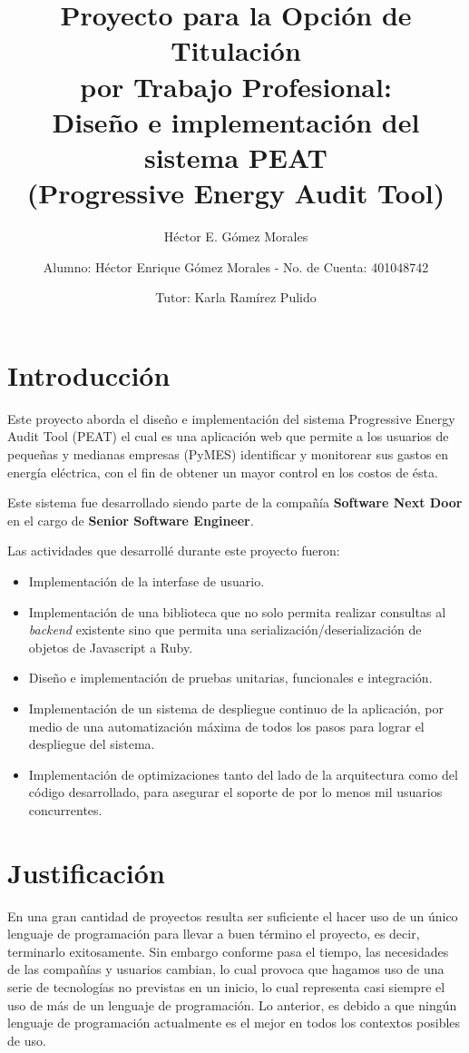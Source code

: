 \documentclass{article}
\author{Héctor E. Gómez Morales}
\title{Proyecto para la Opción de Titulación\\
  por Trabajo Profesional:\\
  Diseño e implementación del sistema PEAT\\
  (Progressive Energy Audit Tool)}
\begin{document}
\author{ Alumno: Héctor Enrique Gómez Morales - No. de Cuenta: 401048742 \and
  Tutor: Karla Ramírez Pulido}
\maketitle
\section{Introducción}
Este proyecto aborda el diseño e implementación del sistema Progressive Energy
Audit Tool (PEAT) el cual es una aplicación web que
permite a los usuarios de pequeñas y medianas empresas (PyMES)
identificar y monitorear sus gastos en energía eléctrica, con el fin de obtener
un mayor control en los costos de ésta.

Este sistema fue desarrollado siendo parte de la compañía
\textbf{Software Next Door} en el cargo de \textbf{Senior Software Engineer}.

Las actividades que desarrollé durante este proyecto fueron:
\begin{itemize}
\item Implementación de la interfase de usuario.
\item Implementación de una biblioteca que no solo permita realizar consultas
  al \textit{backend} existente sino que permita una serialización/deserialización
  de objetos de Javascript a Ruby.
\item Diseño e implementación de pruebas unitarias, funcionales e integración.
\item Implementación de un sistema de despliegue continuo de la aplicación, por
  medio de una automatización máxima de todos los pasos para lograr el despliegue
  del sistema.
\item Implementación de optimizaciones tanto del lado de la arquitectura como
  del código desarrollado, para asegurar el soporte de por lo menos mil usuarios
  concurrentes.
\end{itemize}

\section{Justificación}
En una gran cantidad de proyectos resulta ser suficiente el hacer uso de un
único lenguaje de programación para llevar a buen término el proyecto, es decir,
terminarlo exitosamente. Sin embargo conforme pasa el tiempo, las necesidades
de las compañías y usuarios cambian, lo cual provoca que hagamos uso de una serie de
tecnologías no previstas en un inicio, lo cual representa casi siempre el uso
de más de un lenguaje de programación. Lo anterior, es debido a que ningún
lenguaje de programación actualmente es el mejor en todos los contextos
posibles de uso.
\end{document}

